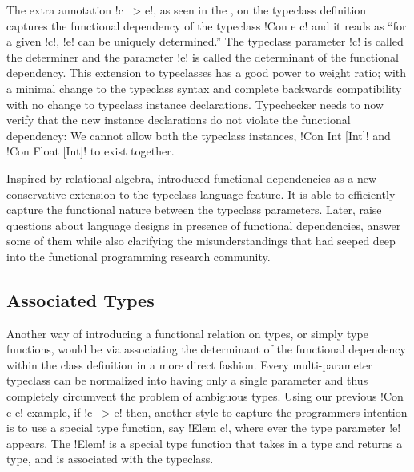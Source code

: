 \documentclass[screen,nonacm,manuscript,review]{acmart} %
\begin{document}
The extra annotation !c ~> e!, as seen in the ,
on the typeclass definition captures the functional dependency of the typeclass
!Con e c! and it reads as ``for a given !c!, !e! can be uniquely
determined.'' The typeclass parameter !c! is called the determiner
and the parameter !e! is called the determinant of the
functional dependency. This extension to typeclasses has a good power
to weight ratio; with a minimal change to the typeclass syntax and
complete backwards compatibility with no change to typeclass instance declarations.
Typechecker needs to now verify that the new instance declarations do
not violate the functional dependency: We cannot allow both the typeclass instances,
!Con Int [Int]! and !Con Float [Int]! to exist together.

Inspired by relational algebra, \citet{jones_tcfd_2000}
introduced functional dependencies as a new conservative extension to
the typeclass language feature. It is able to efficiently capture
the functional nature between the typeclass parameters. Later,
\citet{jones_language_2008} raise questions about language designs in
presence of functional dependencies,  answer some of them while also
clarifying the misunderstandings that had seeped deep into the
functional programming research community.

\subsection{Associated Types}
Another way of introducing a functional relation on types, or simply
type functions, would be via associating the determinant of the
functional dependency within the class
definition in a more direct fashion.
Every multi-parameter typeclass can be normalized into having only a single
parameter and thus completely circumvent the problem of
ambiguous types. Using our previous !Con c e! example, if !c ~> e! then,
another style to capture the programmers intention is to use a special
type function, say !Elem c!, where ever the type parameter
!e! appears. The !Elem! is a special type function that takes in a type
and returns a type, and is associated with the typeclass.
\end{document}
